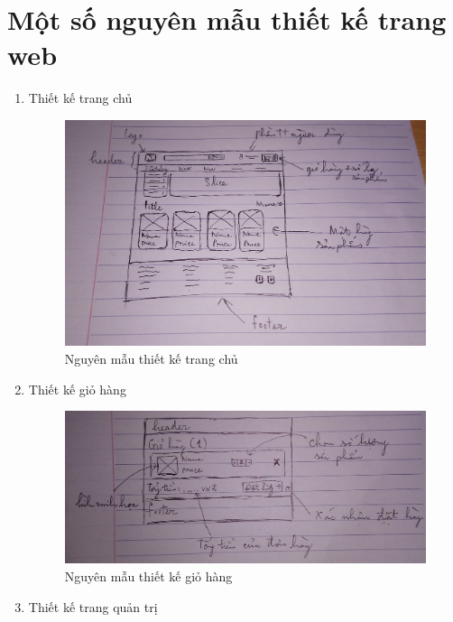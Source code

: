 \section{Một số nguyên mẫu thiết kế trang web}
\begin{enumerate}[label=\textbf{\alph*)}]
    \item Thiết kế trang chủ
    \begin{figure}[h!]
       \centering
       \includegraphics[width=\linewidth]{fig/p_home.jpg}
       \caption{Nguyên mẫu thiết kế trang chủ}
    \end{figure}
    \newpage
    \item Thiết kế giỏ hàng
    \begin{figure}[h!]
       \centering
       \includegraphics[width=\linewidth]{fig/p_cart.jpg}
       \caption{Nguyên mẫu thiết kế giỏ hàng}
    \end{figure}
    \item Thiết kế trang quản trị
    \begin{figure}[h!]
       \centering

\end{figure}
\end{enumerate}
